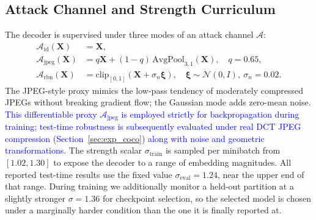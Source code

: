 \documentclass[runningheads]{llncs}
\newcommand{\revised}[1]{\textcolor{blue}{#1}}
\begin{document}
\subsection{Attack Channel and Strength Curriculum}
\label{sec:attack}
The decoder is supervised under three modes of an attack channel $\mathcal{A}$:
\begin{align*}
    \mathcal{A}_{\text{id}}(\mathbf{X}) &= \mathbf{X}, \\
    \mathcal{A}_{\text{jpeg}}(\mathbf{X}) &= q\mathbf{X}+(1-q)\,\mathrm{AvgPool}_{3,1}(\mathbf{X}),\quad q=0.65, \\
    \mathcal{A}_{\text{rbn}}(\mathbf{X}) &= \mathrm{clip}_{[0,1]}(\mathbf{X}+\sigma_{n}\boldsymbol{\xi}),\quad \boldsymbol{\xi}\!\sim\!\mathcal{N}(0,I),\ \sigma_{n}=0.02.
\end{align*}
The JPEG-style proxy mimics the low-pass tendency of moderately compressed JPEGs without breaking gradient flow; the Gaussian mode adds zero-mean noise. \revised{This differentiable proxy $\mathcal{A}_{\text{jpeg}}$ is employed strictly for backpropagation during training; test-time robustness is subsequently evaluated under real DCT JPEG compression (Section~\ref{sec:exp_coco}) along with noise and geometric transformations.} The strength scalar $\sigma_{\text{train}}$ is sampled per minibatch from $[1.02,1.30]$ to expose the decoder to a range of embedding magnitudes. All reported test-time results use the fixed value $\sigma_{\text{eval}}=1.24$, near the upper end of that range. During training we additionally monitor a held-out partition at a slightly stronger $\sigma=1.36$ for checkpoint selection, so the selected model is chosen under a marginally harder condition than the one it is finally reported at.
\end{document}
